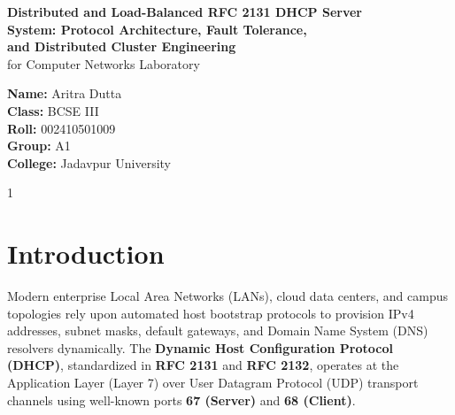 \documentclass[11pt,a4paper]{article}
\begin{document}
\begin{titlepage}
    \centering
    \vspace*{4.2cm}
    
    {\LARGE \textbf{Distributed and Load-Balanced RFC 2131 DHCP Server}}\\[0.7em]
    {\LARGE \textbf{System: Protocol Architecture, Fault Tolerance,}}\\[0.7em]
    {\LARGE \textbf{and Distributed Cluster Engineering}}\\[1.4em]
    
    {\large for Computer Networks Laboratory}
    
    \vspace{3.8cm}
    
    {\large
    \textbf{Name:} Aritra Dutta\\[0.55em]
    \textbf{Class:} BCSE III\\[0.55em]
    \textbf{Roll:} 002410501009\\[0.55em]
    \textbf{Group:} A1\\[0.55em]
    \textbf{College:} Jadavpur University
    }
    
    \vfill
    {\normalsize 1}
\end{titlepage}

\setcounter{page}{2}
\tableofcontents
\newpage

\setcounter{page}{3}

\section{Introduction}
\noindent Modern enterprise Local Area Networks (LANs), cloud data centers, and campus topologies rely upon automated host bootstrap protocols to provision IPv4 addresses, subnet masks, default gateways, and Domain Name System (DNS) resolvers dynamically. The \textbf{Dynamic Host Configuration Protocol (DHCP)}, standardized in \textbf{RFC 2131} and \textbf{RFC 2132}, operates at the Application Layer (Layer 7) over User Datagram Protocol (UDP) transport channels using well-known ports \textbf{67 (Server)} and \textbf{68 (Client)}.
\end{document}
